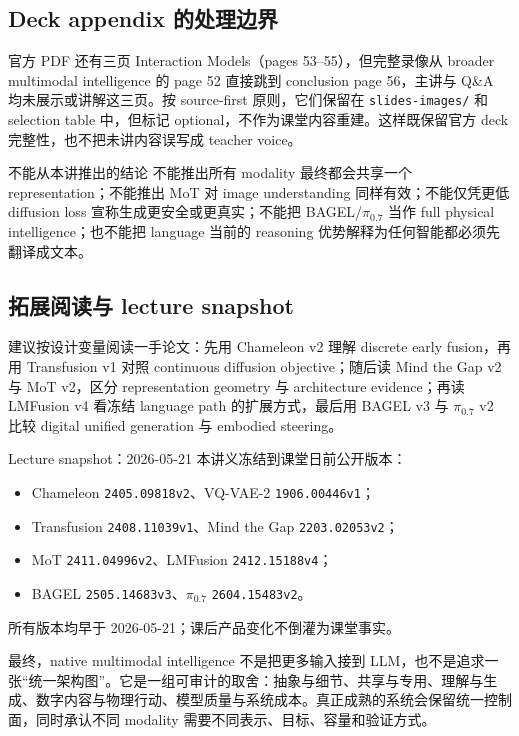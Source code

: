 \subsection{Deck appendix 的处理边界}

官方 PDF 还有三页 Interaction Models（pages 53--55），但完整录像从 broader multimodal intelligence 的 page 52 直接跳到 conclusion page 56，主讲与 Q\&A 均未展示或讲解这三页。按 source-first 原则，它们保留在 \texttt{slides-images/} 和 selection table 中，但标记 optional，不作为课堂内容重建。这样既保留官方 deck 完整性，也不把未讲内容误写成 teacher voice。

\begin{warningbox}{不能从本讲推出的结论}
不能推出所有 modality 最终都会共享一个 representation；不能推出 MoT 对 image understanding 同样有效；不能仅凭更低 diffusion loss 宣称生成更安全或更真实；不能把 BAGEL/$\pi_{0.7}$ 当作 full physical intelligence；也不能把 language 当前的 reasoning 优势解释为任何智能都必须先翻译成文本。
\end{warningbox}

\subsection{拓展阅读与 lecture snapshot}

建议按设计变量阅读一手论文：先用 Chameleon v2 理解 discrete early fusion，再用 Transfusion v1 对照 continuous diffusion objective；随后读 Mind the Gap v2 与 MoT v2，区分 representation geometry 与 architecture evidence；再读 LMFusion v4 看冻结 language path 的扩展方式，最后用 BAGEL v3 与 $\pi_{0.7}$ v2 比较 digital unified generation 与 embodied steering。

\begin{knowledgebox}{Lecture snapshot：2026-05-21}
本讲义冻结到课堂日前公开版本：
\begin{itemize}
  \item Chameleon \texttt{2405.09818v2}、VQ-VAE-2 \texttt{1906.00446v1}；
  \item Transfusion \texttt{2408.11039v1}、Mind the Gap \texttt{2203.02053v2}；
  \item MoT \texttt{2411.04996v2}、LMFusion \texttt{2412.15188v4}；
  \item BAGEL \texttt{2505.14683v3}、$\pi_{0.7}$ \texttt{2604.15483v2}。
\end{itemize}
所有版本均早于 2026-05-21；课后产品变化不倒灌为课堂事实。
\end{knowledgebox}

最终，native multimodal intelligence 不是把更多输入接到 LLM，也不是追求一张“统一架构图”。它是一组可审计的取舍：抽象与细节、共享与专用、理解与生成、数字内容与物理行动、模型质量与系统成本。真正成熟的系统会保留统一控制面，同时承认不同 modality 需要不同表示、目标、容量和验证方式。



